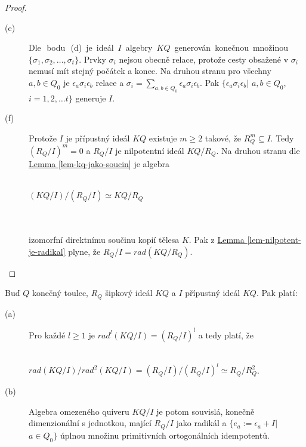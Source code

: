 \begin{proof}
\begin{description}
        \item[(e)] Dle\,\, bodu\,\, (d)\, je\, ideál\, $I$\, algebry\, $KQ$\, generován\, konečnou\, 
          množinou $\{\sigma_1,\sigma_2,\ldots,\sigma_t\}$. Prvky $\sigma_i$ nejsou obecně 
          relace, protože cesty obsažené v $\sigma_i$ nemusí mít stejný počátek 
          a konec. Na druhou stranu pro všechny $a,b\in Q_0$ je $\epsilon_a \sigma_i \epsilon_b$ 
          relace a $\sigma_i=\sum_{a,b\in Q_0}  \epsilon_a \sigma_i \epsilon_b$. 
          Pak $\{ \epsilon_a \sigma_i \epsilon_b|$ $a,b\in Q_0,$ $i=1,2,\ldots t\}$ 
          generuje $I$.
                  
        \item[(f)] Protože $I$ je přípustný ideál $KQ$ existuje $m\geq 2$ takové, že $R_Q^m\subseteq 
          I$. Tedy $(R_Q/I)^m=0$ a $R_Q/I$ je nilpotentní ideál $KQ/R_Q$. Na 
          druhou stranu dle \hyperref[lem-kq-jako-soucin]{Lemma 
          \ref*{lem-kq-jako-soucin}} je algebra \\\\
          \centerline{$(KQ/I)/(R_Q/I)\simeq KQ/R_Q$} \\\\
          izomorfní direktnímu součinu kopií tělesa $K$.
          Pak z  \hyperref[lem-nilpotent-je-radikal]{Lemma 
          \ref*{lem-nilpotent-je-radikal}} plyne, že $R_Q/I=rad(KQ/R_Q)$.
          
        
      \end{description}
    \end{proof}
    
    \begin{dsl}\label{mega-veta-toulec-dsl}
      Buď $Q$ konečný toulec, $R_Q$ šipkový ideál $KQ$ a $I$ přípustný ideál $KQ$. 
      Pak platí:
      \begin{description}
         \item[(a)]Pro každé $l\geq1$ je $rad^l(KQ/I)=(R_Q/I)^l$ a tedy platí, že  \\\\
           \centerline{$rad(KQ/I)/rad^2(KQ/I)=(R_Q/I)/(R_Q/I)^l\simeq R_Q/R_Q^2$.\\}
         
         \item[(b)]        
          Algebra omezeného quiveru $KQ/I$ je potom souvislá, konečně 
          dimenzionální s jednotkou, mající $R_Q/I$ jako radikál a $\{e_a:=\epsilon_a+I|$ $a\in Q_0\}$ 
          úplnou množinu primitivních ortogonálních idempotentů.
      \end{description}
    \end{dsl} 
    
